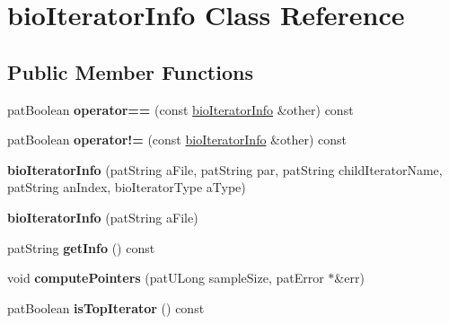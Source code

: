 \hypertarget{classbio_iterator_info}{}\section{bio\+Iterator\+Info Class Reference}
\label{classbio_iterator_info}
\subsection*{Public Member Functions}
\begin{DoxyCompactItemize}
\item 
\mbox{\label{classbio_iterator_info_a9bb3e271e44324aa07c88a9ef2696d75}} 
pat\+Boolean {\bfseries operator==} (const \hyperlink{classbio_iterator_info}{bio\+Iterator\+Info} \&other) const
\item 
\mbox{\label{classbio_iterator_info_af4caac691988f3a73a14bec5e50ac388}} 
pat\+Boolean {\bfseries operator!=} (const \hyperlink{classbio_iterator_info}{bio\+Iterator\+Info} \&other) const
\item 
\mbox{\label{classbio_iterator_info_a41ae4bea7c632089d686a885d73c9868}} 
{\bfseries bio\+Iterator\+Info} (pat\+String a\+File, pat\+String par, pat\+String child\+Iterator\+Name, pat\+String an\+Index, bio\+Iterator\+Type a\+Type)
\item 
\mbox{\label{classbio_iterator_info_a947311306a98ba35ddd8281f880b4eae}} 
{\bfseries bio\+Iterator\+Info} (pat\+String a\+File)
\item 
\mbox{\label{classbio_iterator_info_a38e7162249607cb662e5b7e46c3ce548}} 
pat\+String {\bfseries get\+Info} () const
\item 
\mbox{\label{classbio_iterator_info_af9fae6aeacca95bc94a673c5a847ecec}} 
void {\bfseries compute\+Pointers} (pat\+U\+Long sample\+Size, pat\+Error $\ast$\&err)
\item 
\mbox{\label{classbio_iterator_info_a11f10355772343163db076938acc186c}} 
pat\+Boolean {\bfseries is\+Top\+Iterator} () const
\item 
\mbox{\label{classbio_iterator_info_a79c322d5cef07b1f93d4ae77614b989c}} 

\end{DoxyCompactItemize}
